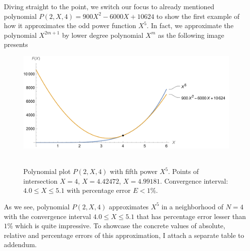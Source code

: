 Diving straight to the point, we switch our focus to already mentioned polynomial $P(2,X,4) = 900X^2 - 6000X + 10624$
to show the first example of how it approximates the odd power function $X^5$.
In fact, we approximate the polynomial $X^{2m+1}$ by lower degree polynomial $X^m$ as the following image presents
\begin{figure}[H]
    \centering
    \includegraphics[width=1\textwidth]{sections/images/03_plots_polynomial_p2_n4_with_fifth}
    ~\caption{Polynomial plot $P(2, X, 4)$ with fifth power $X^5$.
    Points of intersection $X=4$, $X=4.42472$, $X=4.99181$.
    Convergence interval: $4.0 \leq X \leq 5.1$ with percentage error $E < 1\%$.
    }\label{fig:03_plots_polynomial_p2_n4_with_fifth}
\end{figure}
As we see, polynomial $P(2, X, 4)$ approximates $X^5$ in a neighborhood of $N=4$ with
the convergence interval $4.0 \leq X \leq 5.1$ that has percentage error lesser than $1\%$ which is quite impressive.
To showcase the concrete values of absolute, relative and percentage errors of this approximation, I attach a separate
table to addendum.

